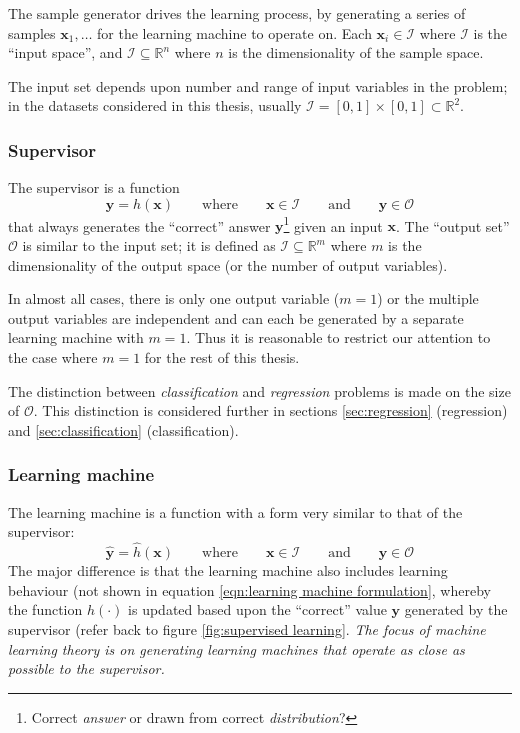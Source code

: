 The sample generator drives the learning process, by generating a
series of samples $\mathbf{x}_1, \ldots$ for the learning machine to
operate on.  Each $\mathbf{x}_i \in \mathcal{I}$ where $\mathcal{I}$
is the ``input space'', and $\mathcal{I} \subseteq \mathbb{R}^n$ where
$n$ is the dimensionality of the sample space.

The input set depends upon number and range of input variables in the
problem; in the datasets considered in this thesis, usually
$\mathcal{I} = [0,1] \times [0,1] \subset \mathbb{R}^2$.


\subsubsection{Supervisor}
\label{sec:supervisor}

The supervisor is a function
%
\begin{equation}
\mathbf{y} = h(\mathbf{x}) \qquad \mbox{where} \qquad \mathbf{x} \in
\mathcal{I} \qquad \mbox{and} \qquad \mathbf{y} \in \mathcal{O}
\label{eqn:supervisor}
\end{equation}
%
that always generates the ``correct'' answer
$\mathbf{y}$\footnote{Correct \emph{answer} or drawn from correct
\emph{distribution}?} given an input $\mathbf{x}$.  The ``output set''
$\mathcal{O}$ is similar to the input set; it is defined as $\mathcal{I}
\subseteq \mathbb{R}^m$ where $m$ is the dimensionality of the output
space (or the number of output variables).

In almost all cases, there is only one output variable ($m=1$) or the
multiple output variables are independent and can each
be generated by a separate learning machine with $m=1$.
Thus it is reasonable to restrict our attention to the case where
$m=1$ for the rest of this thesis.

The distinction between \emph{classification} and \emph{regression}
problems is made on the size of $\mathcal{O}$.  This distinction is 
considered further in sections \ref{sec:regression} (regression) and
\ref{sec:classification} (classification).


\subsubsection{Learning machine}
\label{sec:learning machine}

The learning machine is a function with a form very similar to that of
the supervisor:
%
\begin{equation}
\mathbf{\hat{y}} = \hat{h}(\mathbf{x}) \qquad \mbox{where} \qquad
\mathbf{x} \in \mathcal{I} \qquad \mbox{and} \qquad \mathbf{y} \in
\mathcal{O}
\label{eqn:learning machine formulation}
\end{equation}
%
The major difference is that the learning machine also includes
learning behaviour (not shown in equation \ref{eqn:learning machine
formulation}, whereby the function $\hat{h}(\cdot)$ is updated
based upon the ``correct'' value $\mathbf{y}$ generated by the
supervisor (refer back to figure \ref{fig:supervised learning}.
\emph{The focus of machine learning theory is on generating learning
machines that operate as close as possible to the supervisor.}



